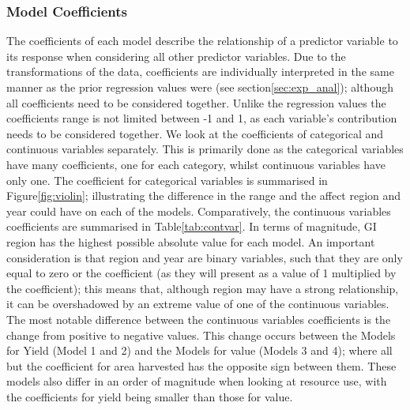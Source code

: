 \documentclass[review,12pt,authoryear]{elsarticle}
\begin{document}
\begin{linenumbers}
\subsubsection{Model Coefficients}
%
The coefficients of each model describe the relationship of a predictor variable to its response when considering all other predictor variables. Due to the transformations of the data, coefficients are individually interpreted in the same manner as the prior regression values were (see section\ref{sec:exp_anal}); although all coefficients need to be considered together. Unlike the regression values the coefficients range is not limited between -1 and 1, as each variable's contribution needs to be considered together.
\newline
We look at the coefficients of categorical and continuous variables  separately. This is primarily done as the categorical variables have many coefficients, one for each category, whilst continuous variables have only one. The coefficient for categorical variables is summarised in Figure\ref{fig:violin}; illustrating the difference in the range and the affect region and year could have on each of the models. Comparatively, the continuous variables coefficients are summarised in Table\ref{tab:contvar}.
In terms of magnitude, GI region has the highest possible absolute value for each model. An important consideration is that region and year are binary variables, such that they are only equal to zero or the coefficient (as they will present as a value of 1 multiplied by the coefficient); this means that, although region may have a strong relationship, it can be overshadowed by an extreme value of one of the continuous variables. The most notable difference between the continuous variables coefficients is the change from positive to negative values. This change occurs between the Models for Yield (Model 1 and 2) and the Models for value (Models 3 and 4); where all but the coefficient for area harvested has the opposite sign between them. These models also differ in an order of magnitude when looking at resource use, with the coefficients for yield being smaller than those for value. 
%

\end{linenumbers}
\end{document}
